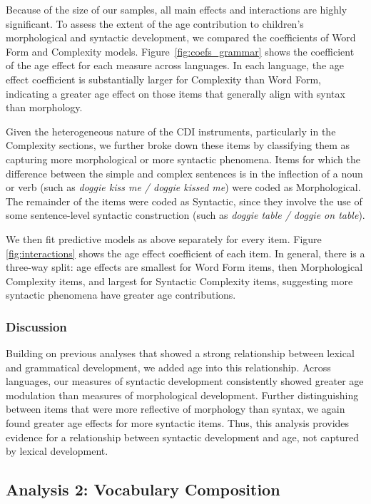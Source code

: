 \documentclass[10pt,letterpaper]{article}
\begin{document}
Because of the size of our samples, all main effects and interactions are highly significant. To assess the extent of the age contribution to children's morphological and syntactic development, we compared the coefficients of Word Form and Complexity models. Figure~\ref{fig:coefs_grammar} shows the coefficient of the age effect for each measure across languages. In each language, the age effect coefficient is substantially larger for Complexity than Word Form, indicating a greater age effect on those items that generally align with syntax than morphology.

Given the heterogeneous nature of the CDI instruments, particularly in the Complexity sections, we further broke down these items by classifying them as capturing more morphological or more syntactic phenomena. Items for which the difference between the simple and complex sentences is in the inflection of a noun or verb (such as \emph{doggie kiss me / doggie kissed me}) were coded as Morphological. The remainder of the items were coded as Syntactic, since they involve the use of some sentence-level syntactic construction (such as \emph{doggie table / doggie on table}).

We then fit predictive models as above separately for every item. Figure \ref{fig:interactions} shows the age effect coefficient of each item. In general, there is a three-way split: age effects are smallest for Word Form items, then Morphological Complexity items, and largest for Syntactic Complexity items, suggesting more syntactic phenomena have greater age contributions. 

\vfill
\subsubsection{Discussion}

Building on previous analyses that showed a strong relationship between lexical and grammatical development, we added age into this relationship. Across languages, our measures of syntactic development consistently showed greater age modulation than measures of morphological development. Further distinguishing between items that were more reflective of morphology than syntax, we again found greater age effects for more syntactic items. Thus, this analysis provides evidence for a relationship between syntactic development and age, not captured by lexical development.

\subsection{Analysis 2: Vocabulary Composition}
\end{document}

